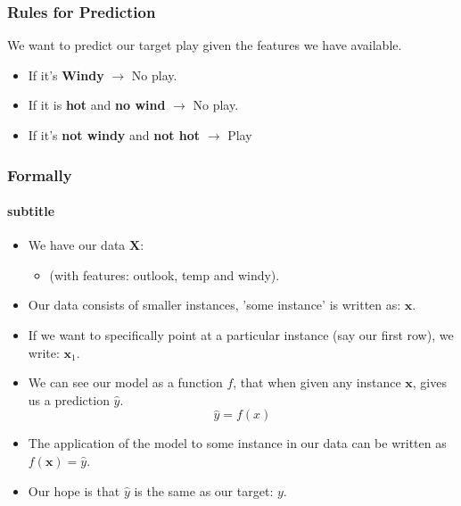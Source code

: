 \documentclass{beamer}
\begin{document}
\begin{frame}[t]
  \frametitle{Rules for Prediction}


  \begin{tcolorbox}[myblock={Objective}]
    \small
    We want to predict our \alert{target} play given the \alert{features} we have available.
  \end{tcolorbox}
 \pause 

 \begin{itemize}
   \item If it's \textbf{Windy} $\longrightarrow$ No play. \\\vspace*{1cm}\pause
   \item If it is \textbf{hot} and \textbf{no wind} $\longrightarrow$ No play.\\\vspace*{1cm}\pause
   \item If it's \textbf{not windy} and \textbf{not hot} $\longrightarrow$ Play
 \end{itemize}
\end{frame}

\begin{frame}[t]
  \frametitle{Formally}
  \framesubtitle{subtitle}

\begin{itemize}
  \item We have our \alert{data} $\mathbf{X}$:
  \begin{itemize}
    \item (with \alert{features:} outlook, temp and windy).
  \end{itemize}
\item Our data consists of smaller \alert{instances}, 'some instance' is written as: $\mathbf{x}$.
  \item If we want to specifically point at a particular instance (say our first row), we write: $\mathbf{x}_1$.
  \item We can see our model as a function $f$, that when given any instance $\mathbf{x}$, gives us a prediction $\hat{y}$.
    $$
    \hat{y} = f(x)
    $$
  \item The application of the model to some instance in our data can be written as $f(\mathbf{x}) = \hat{y}$.
  \item Our hope is that $\hat{y}$ is the same as our \alert{target}: $y$.
\end{itemize}
  
\end{frame}
\end{document}
